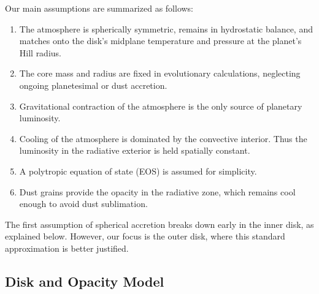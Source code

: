 \documentclass[apj, numberedappendix]{emulateapj}
\begin{document}
Our main assumptions are summarized as follows:
\begin{enumerate}
\item The atmosphere is spherically symmetric, remains in hydrostatic balance, and matches onto the disk's midplane temperature and pressure at the planet's Hill radius.
\item The core mass and radius are fixed in evolutionary calculations, neglecting ongoing planetesimal or dust accretion.
\item Gravitational contraction of the atmosphere is the only source of planetary luminosity.  
\item Cooling of the atmosphere is dominated by the convective interior.  Thus the luminosity in the radiative exterior is held spatially constant. 
\item A polytropic equation of state (EOS) is assumed for simplicity.
\item Dust grains provide the opacity in the radiative zone, which remains cool enough to avoid dust sublimation.
\end{enumerate}

The first assumption of spherical accretion breaks down early in the inner disk, as explained below.  However, our focus is the outer disk, where this standard approximation is better justified.

\subsection{Disk and Opacity Model}\label{sec:disk}
\end{document}

